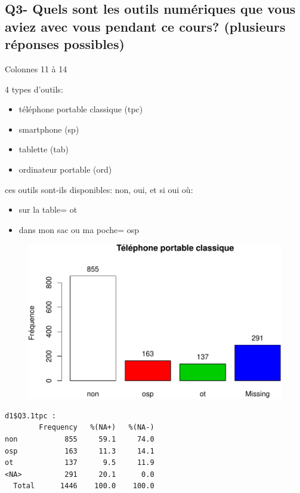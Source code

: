 \documentclass[]{article}
\begin{document}
\subsection{Q3- Quels sont les outils numériques que vous aviez avec
vous pendant ce cours? (plusieurs réponses
possibles)}\label{q3--quels-sont-les-outils-numeriques-que-vous-aviez-avec-vous-pendant-ce-cours-plusieurs-reponses-possibles}

Colonnes 11 à 14

4 types d'outils:

\begin{itemize}
\itemsep1pt\parskip0pt
\item
  téléphone portable classique (tpc)
\item
  smartphone (sp)
\item
  tablette (tab)
\item
  ordinateur portable (ord)
\end{itemize}

ces outils sont-ils disponibles: non, oui, et si oui où:

\begin{itemize}
\itemsep1pt\parskip0pt
\item
  sur la table= ot
\item
  dans mon sac ou ma poche= osp
\end{itemize}

\begin{figure}[htbp]
\centering
\includegraphics{qs_etudiants_files/figure-latex/outils-1.pdf}
\end{figure}

\begin{verbatim}
d1$Q3.1tpc : 
        Frequency   %(NA+)   %(NA-)
non           855     59.1     74.0
osp           163     11.3     14.1
ot            137      9.5     11.9
<NA>          291     20.1      0.0
  Total      1446    100.0    100.0
\end{verbatim}
\end{document}

